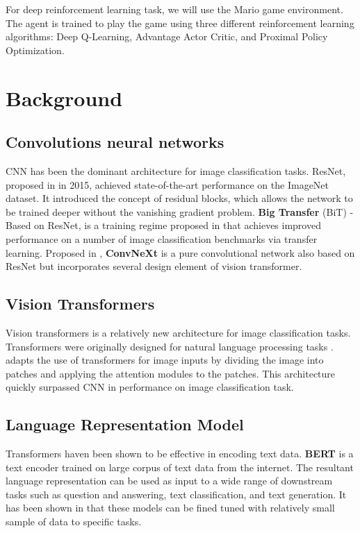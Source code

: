 \documentclass[conference]{IEEEtran}
\begin{document}
For deep reinforcement learning task, we will use the Mario game environment. The agent is trained to play the game using three different reinforcement learning algorithms: Deep Q-Learning, Advantage Actor Critic, and Proximal Policy Optimization.

\section{Background}

\subsection{Convolutions neural networks}

CNN has been the dominant architecture for image classification tasks. ResNet, proposed in \cite{heDeepResidualLearning2015} in 2015, achieved state-of-the-art performance on the ImageNet dataset. It introduced the concept of residual blocks, which allows the network to be trained deeper without the vanishing gradient problem. \textbf{Big Transfer} (BiT) - Based on ResNet\cite{heDeepResidualLearning2015}, is a training regime proposed in \cite{kolesnikovBigTransferBiT2020} that achieves improved performance on a number of image classification benchmarks via transfer learning. Proposed in \cite{liuConvNet2020s2022}, \textbf{ConvNeXt} is a pure convolutional network also based on ResNet but incorporates several design element of vision transformer.

\subsection{Vision Transformers}

Vision transformers is a relatively new architecture for image classification tasks. Transformers were originally designed for natural language processing tasks \cite{vaswaniAttentionAllYou2023}. \cite{dosovitskiyImageWorth16x162021} adapts the use of transformers for image inputs by dividing the image into patches and applying the attention modules to the patches. This architecture quickly surpassed CNN in performance on image classification task\cite{PapersCodeImageNet}.

\subsection{Language Representation Model}

Transformers \cite{vaswaniAttentionAllYou2023} haven been shown to be effective in encoding text data. \textbf{BERT} \cite{devlinBERTPretrainingDeep2019} is a text encoder trained on large corpus of text data from the internet. The resultant language representation can be used as input to a wide range of downstream tasks such as question and answering, text classification, and text generation. It has been shown in \cite{brownLanguageModelsAre2020} that these models can be fined tuned with relatively small sample of data to specific tasks.
\end{document}

